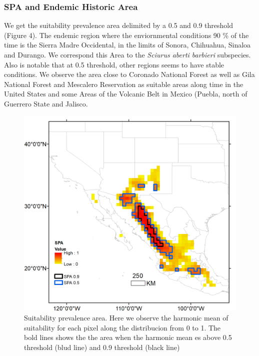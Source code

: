 \documentclass[
]{article}
\begin{document}
\hypertarget{spa-and-endemic-historic-area}{%
\subsubsection{SPA and Endemic Historic
Area}\label{spa-and-endemic-historic-area}}

We get the suitability prevalence area delimited by a 0.5 and 0.9
threshold (Figure 4). The endemic region where the enviornmental
conditions 90 \% of the time is the Sierra Madre Occidental, in the
limits of Sonora, Chihuahua, Sinaloa and Durango. We correspond this
Area to the \emph{Sciurus aberti barbieri} subspecies. Also is notable
that at 0.5 threshold, other regions seems to have stable conditions. We
observe the area close to Coronado National Forest as well as Gila
National Forest and Mescalero Reservation as suitable areas along time
in the United States and some Areas of the Volcanic Belt in Mexico
(Puebla, north of Guerrero State and Jalisco.\\

\begin{figure}
\centering
\includegraphics{all_figures/figure_4.png}
\caption{Suitability prevalence area. Here we observe the harmonic mean
of suitability for each pixel along the distribucion from 0 to 1. The
bold lines shows the the area when the harmonic mean es above 0.5
threshold (blud line) and 0.9 threshold (black line)}
\end{figure}
\end{document}
